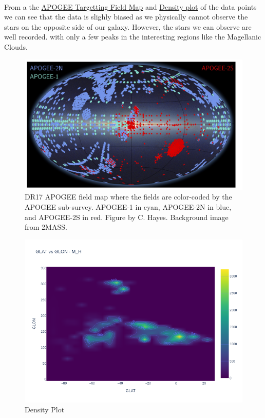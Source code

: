 \documentclass{article}
\begin{document}
\paragraph{}
From a the \hyperref[fig:2]{APOGEE Targetting Field Map} and \hyperref[fig:3]{Density plot} of the data points we can see that the data is slighly biased as we physically cannot observe the stars on the opposite side of our galaxy. However, the stars we can observe are well recorded. with only a few peaks in the interesting regions like the Magellanic Clouds.

\begin{figure}[H]
   \centering
   \label{fig:2}
   \includegraphics[width=\textwidth]{Images/ApogeeCoverage.jpg}
   \caption{DR17 APOGEE field map where the fields are color-coded by the APOGEE sub-survey. APOGEE-1 in cyan, APOGEE-2N in blue, and APOGEE-2S in red. Figure by C. Hayes. Background image from 2MASS.}
\end{figure}
\begin{figure}[H]
    \centering
    \label{fig:3}
    \includegraphics[width=\textwidth]{Images/GLAT vs GLON - Density.png}
    \caption{Density Plot}
\end{figure}
\end{document}
